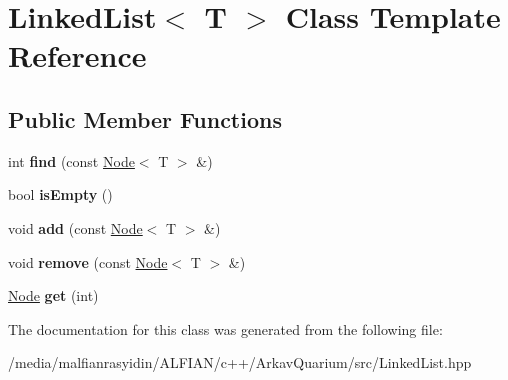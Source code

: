 \hypertarget{class_linked_list}{}\section{Linked\+List$<$ T $>$ Class Template Reference}
\label{class_linked_list}
\subsection*{Public Member Functions}
\begin{DoxyCompactItemize}
\item 
\mbox{\label{class_linked_list_a8ef3a028835471b2974552005e621323}} 
int {\bfseries find} (const \mbox{\hyperlink{class_node}{Node}}$<$ T $>$ \&)
\item 
\mbox{\label{class_linked_list_a7ecbb28e82117a680839ed0dc28ebdce}} 
bool {\bfseries is\+Empty} ()
\item 
\mbox{\label{class_linked_list_af2625170c2f18346900058daab78caf0}} 
void {\bfseries add} (const \mbox{\hyperlink{class_node}{Node}}$<$ T $>$ \&)
\item 
\mbox{\label{class_linked_list_aa2d9c914f6b451adbf7f56f4c9c86a6a}} 
void {\bfseries remove} (const \mbox{\hyperlink{class_node}{Node}}$<$ T $>$ \&)
\item 
\mbox{\label{class_linked_list_af640cd5af2af1e91fae857155fd76230}} 
\mbox{\hyperlink{class_node}{Node}} {\bfseries get} (int)
\end{DoxyCompactItemize}


The documentation for this class was generated from the following file\+:\begin{DoxyCompactItemize}
\item 
/media/malfianrasyidin/\+A\+L\+F\+I\+A\+N/c++/\+Arkav\+Quarium/src/Linked\+List.\+hpp\end{DoxyCompactItemize}
